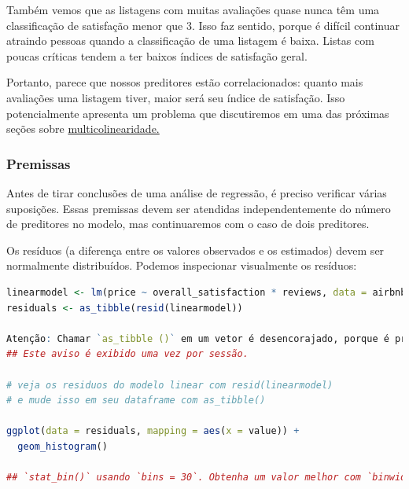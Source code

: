 \documentclass{article}
\begin{document}
Também vemos que as listagens com muitas avaliações quase nunca têm uma classificação de satisfação menor que 3. Isso faz sentido, porque é difícil continuar atraindo pessoas quando a classificação de uma listagem é baixa. Listas com poucas críticas tendem a ter baixos índices de satisfação geral.

Portanto, parece que nossos preditores estão correlacionados: quanto mais avaliações uma listagem tiver, maior será seu índice de satisfação. Isso potencialmente apresenta um problema que discutiremos em uma das próximas seções sobre \href{https://bookdown.org/content/1340/linear-regression.html#multicollinearity}{multicolinearidade.}

\subsubsection{Premissas}

Antes de tirar conclusões de uma análise de regressão, é preciso verificar várias suposições. Essas premissas devem ser atendidas independentemente do número de preditores no modelo, mas continuaremos com o caso de dois preditores.


Os resíduos (a diferença entre os valores observados e os estimados) devem ser normalmente distribuídos. Podemos inspecionar visualmente os resíduos:

\begin{lstlisting}[language=R]
linearmodel <- lm(price ~ overall_satisfaction * reviews, data = airbnb)
residuals <- as_tibble(resid(linearmodel))  

Atenção: Chamar `as_tibble ()` em um vetor é desencorajado, porque é provável que o comportamento mude no futuro. Use `enframe (name = NULL)` em seu lugar.
## Este aviso é exibido uma vez por sessão.

# veja os residuos do modelo linear com resid(linearmodel) 
# e mude isso em seu dataframe com as_tibble()

ggplot(data = residuals, mapping = aes(x = value)) + 
  geom_histogram()
  
## `stat_bin()` usando `bins = 30`. Obtenha um valor melhor com `binwidth`.
\end{lstlisting}
\end{document}
